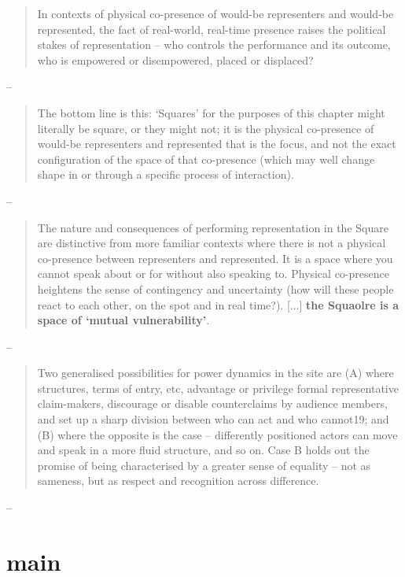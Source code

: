 \begin{quote}
	In contexts of physical co-presence of would-be representers and would-be represented, the fact of real-world, real-time presence raises the political stakes of representation – who controls the performance and its outcome, who is empowered or disempowered, placed or displaced?
\end{quote}
-- \cite[3]{saward2024}


\begin{quote}
	The bottom line is this: ‘Squares’ for the purposes of this chapter might literally be square, or they might not; it is the physical co-presence of would-be representers and represented that is the focus, and not the exact configuration of the space of that co-presence (which may well change shape in or through a specific process of interaction).
\end{quote}
-- \cite[5]{saward2024}

\begin{quote}
	The nature and consequences of performing representation in the Square are distinctive from more familiar contexts where there is not a physical co-presence between representers and represented. It is a space where you cannot speak about or for without also speaking to. Physical co-presence heightens the sense of contingency and uncertainty (how will these people react to each other, on the spot and in real time?). [...] \textbf{the Squaolre is a space of ‘mutual vulnerability’}.
\end{quote}
-- \cite[5]{saward2024}

\begin{quote}
	Two generalised possibilities for power dynamics in the site are (A) where structures, terms of entry, etc, advantage or privilege formal representative claim-makers, discourage or disable counterclaims by audience members, and set up a sharp division between who can act and who cannot19; and (B) where the opposite is the case – differently positioned actors can move and speak in a more fluid structure, and so on. Case B holds out the promise of being characterised by a greater sense of equality – not as sameness, but as respect and recognition across difference.
\end{quote}
-- \cite[13]{saward2024}




\chapter{main}\label{chap:main} %

